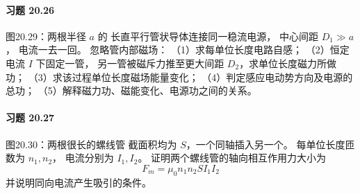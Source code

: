 \paragraph{习题 20.26}
图20.29：两根半径 \(a\) 的
长直平行管状导体连接同一稳流电源，
中心间距 \(D_1\gg a\)，
电流一去一回。
忽略管内部磁场：
（1）求每单位长度电路自感；
（2）恒定电流 \(I\) 下固定一管，
另一管被磁斥力推至更大间距
\(D_2\)，求单位长度磁力所做功；
（3）求该过程单位长度磁场能量变化；
（4）判定感应电动势方向及电源的总功；
（5）解释磁力功、磁能变化、电源功之间的关系。

\paragraph{习题 20.27}
图20.30：两根很长的螺线管
截面积均为 \(S\)，一个同轴插入另一个。
每单位长度匝数为 \(n_1,n_2\)，
电流分别为 \(I_1,I_2\)。
证明两个螺线管的轴向相互作用力大小为
\[
 \boxed{F_m=\mu_0n_1n_2SI_1I_2}
\]
并说明同向电流产生吸引的条件。
